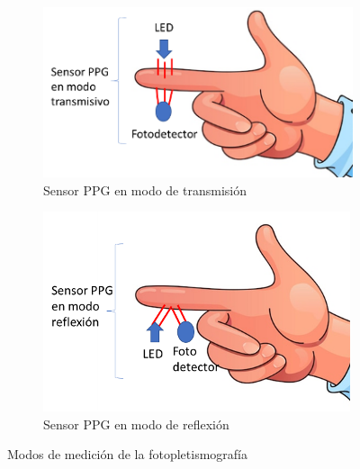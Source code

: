             \begin{figure}[H]
                \centering
                \begin{subfigure}[b]{0.45\linewidth}
                    \includegraphics[width=\linewidth]{img/Marco/PPG_transmisivo.png}
                    \caption{Sensor PPG en modo de transmisión}
                    \label{fig:PPG_transmisivo}
                \end{subfigure}
                \begin{subfigure}[b]{0.45\linewidth}
                    \includegraphics[width=\linewidth]{img/Marco/PPG_reflexion.png}
                    \caption{Sensor PPG en modo de reflexión}
                    \label{fig:PPG_reflexion}
                \end{subfigure}
                \caption[Modos de medición de la fotopletismografía]{Modos de medición de la fotopletismografía\footnotemark}
                \label{fig:modosMedicionPPG}
            \end{figure}

